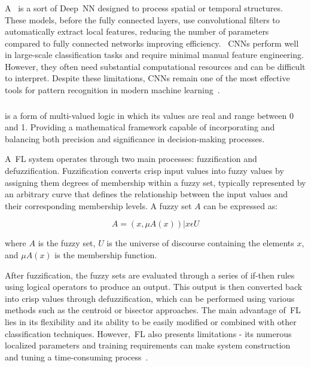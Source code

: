 \subsubsection{}
\label{sssec:convolutional_neural_network}

A~ is a sort of Deep~\gls{NN} designed to process spatial or temporal structures. These models, before the fully connected layers, use convolutional filters to 
automatically extract local features, reducing the number of parameters compared to fully connected networks improving efficiency.
~\glspl{CNN} perform well in large-scale classification tasks and require minimal manual feature engineering. However, they often need substantial computational resources and can be difficult 
to interpret. Despite these limitations, CNNs remain one of the most effective tools for pattern recognition in modern machine learning~\cite{Review_IRBM_EMG}.


\subsubsection{} 
\label{sssec:fuzzy_logic}

 is a form of multi-valued logic in which its values are real and range between 0 and 1. Providing a mathematical framework capable of incorporating and balancing both precision and significance in 
decision-making processes.

A~\gls{FL} system operates through two main processes: fuzzification and defuzzification.
Fuzzification converts crisp input values into fuzzy values by assigning them degrees of membership within a fuzzy set, typically represented by an arbitrary curve that defines 
the relationship between the input values and their corresponding membership levels. A fuzzy set $A$ can be expressed as:

\begin{equation}
  A = {(x,  \mu A(x))  |  x  \epsilon  U} 
  \label{eq:fuzzyLogicEQ}
\end{equation}

where $A$ is the fuzzy set, $U$ is the universe of discourse containing the elements $x$, and $\mu A(x)$ is the membership function.

After fuzzification, the fuzzy sets are evaluated through a series of if-then rules using logical operators to produce an output. This output is then converted back into crisp 
values through defuzzification, which can be performed using various methods such as the centroid or bisector approaches.
The main advantage of~\gls{FL} lies in its flexibility and its ability to be easily modified or combined with other classification techniques. However,~\gls{FL} also presents limitations - 
its numerous localized parameters and training requirements can make system construction and tuning a time-consuming process~\cite{ComprehensiveStudyOnEMG}.

